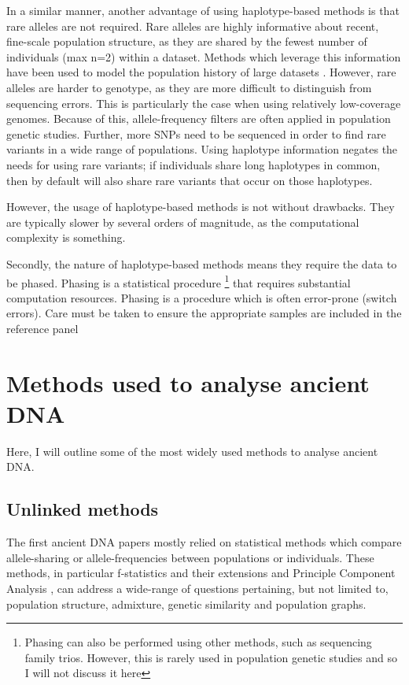 In a similar manner, another advantage of using haplotype-based methods is that rare alleles are not required. Rare alleles are highly informative about recent, fine-scale population structure, as they are shared by the fewest number of individuals (max n=2) within a dataset. Methods which leverage this information have been used to model the population history of large datasets \cite{schiffels2016iron, gravel2011demographic, o2015rare}. However, rare alleles are harder to genotype, as they are more difficult to distinguish from sequencing errors. This is particularly the case when using relatively low-coverage genomes. Because of this, allele-frequency filters are often applied in population genetic studies. Further, more SNPs need to be sequenced in order to find rare variants in a wide range of populations. Using haplotype information negates the needs for using rare variants; if individuals share long haplotypes in common, then by default will also share rare variants that occur on those haplotypes. 

However, the usage of haplotype-based methods is not without drawbacks. They are typically slower by several orders of magnitude, as the computational complexity is something. 

Secondly, the nature of haplotype-based methods means they require the data to be phased. Phasing is a statistical procedure \footnote{Phasing can also be performed using other methods, such as sequencing family trios. However, this is rarely used in population genetic studies and so I will not discuss it here} that requires substantial computation resources. Phasing is a procedure which is often error-prone (switch errors). Care must be taken to ensure the appropriate samples are included in the reference panel


\section{Methods used to analyse ancient DNA}

Here, I will outline some of the most widely used methods to analyse ancient DNA.

\subsection{Unlinked methods}

The first ancient DNA papers mostly relied on statistical methods which compare allele-sharing or allele-frequencies between populations or individuals. These methods, in particular f-statistics and their extensions \cite{Green2010, Patterson2012, peter2016admixture, AssessingqpAdm} and Principle Component Analysis \cite{price2006principal}, can address a wide-range of questions pertaining, but not limited to, population structure, admixture, genetic similarity and population graphs. 

